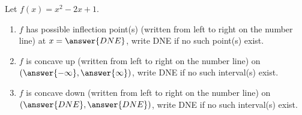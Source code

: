 \documentclass{ximera}
\author{Gregory Hartman \and Matthew Carr}
\begin{document}
\begin{exercise}




Let $f(x)=x^2-2x+1$. 
\begin{enumerate}
\item $f$ has possible inflection point(s) (written from left to right
  on the number line) at $x=\answer{DNE}$,
  write DNE if no such point(s) exist.
\item $f$ is concave up (written from left to right on the number
  line) on
  $(\answer{-\infty},\answer{\infty})$,
  write DNE if no such interval(s) exist.
\item $f$ is concave down (written from left to right on the number
  line) on $(\answer{DNE},\answer{DNE})$,
  write DNE if no such interval(s) exist.
\end{enumerate}

\end{exercise}
\end{document}

